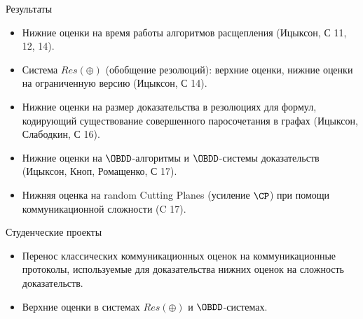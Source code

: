 \begin{frame}{Результаты}

    \begin{itemize}
        \item Нижние оценки на время работы алгоритмов расщепления (Ицыксон, С 11, 12, 14).
        \pause
        \item Система $Res(\oplus)$ (обобщение резолюций): верхние оценки, нижние оценки на ограниченную версию (Ицыксон,
            С 14).
        \pause
        \item Нижние оценки на размер доказательства в резолюциях для формул, кодирующий существование совершенного
            паросочетания в графах (Ицыксон, Слабодкин, С 16).
        \pause
        \item Нижние оценки на $\OBDD$-алгоритмы и $\OBDD$-системы доказательств (Ицыксон, Кноп, Ромащенко, С 17).
        \pause
        \item Нижняя оценка на {\color{blue} random} Cutting Planes (усиление $\CP$) при помощи коммуникационной сложности (C
            17).
    \end{itemize}

\end{frame}


\begin{frame}{Студенческие проекты}

    \begin{itemize}
        \item Перенос классических коммуникационных оценок на коммуникационные протоколы, используемые
            для доказательства нижних оценок на сложность доказательств.
        \pause
        \item Верхние оценки в системах $Res(\oplus)$ и $\OBDD$-системах.    
    \end{itemize}
\end{frame}